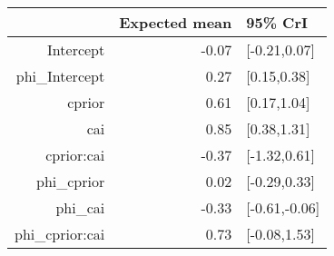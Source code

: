 \begin{tabular}{rrl}
  \hline
 & Expected mean & 95\% CrI \\ 
  \hline
Intercept & -0.07 & [-0.21,0.07] \\ 
  phi\_Intercept & 0.27 & [0.15,0.38] \\ 
  cprior & 0.61 & [0.17,1.04] \\ 
  cai & 0.85 & [0.38,1.31] \\ 
  cprior:cai & -0.37 & [-1.32,0.61] \\ 
  phi\_cprior & 0.02 & [-0.29,0.33] \\ 
  phi\_cai & -0.33 & [-0.61,-0.06] \\ 
  phi\_cprior:cai & 0.73 & [-0.08,1.53] \\ 
   \hline
\end{tabular}

